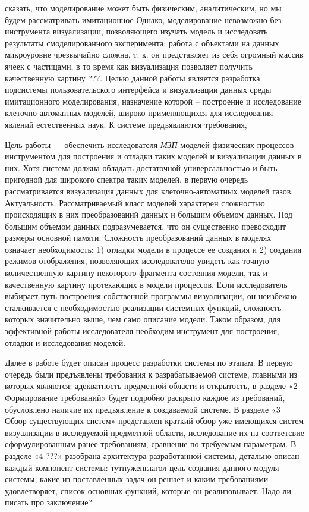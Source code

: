 \documentclass[a4paper,12pt]{extarticle}
\begin{document}
сказать, что моделирование может быть физическим, аналитическим, но мы будем рассматривать имитационное
Однако, моделирование невозможно без инструмента визуализации, позволяющего изучать модель и исследовать результаты смоделированного эксперимента: работа с объектами на данных микроуровне чрезвычайно сложна, т. к. он представляет из себя огромный массив ячеек с частицами, в то время как визуализация позволяет получить качественную картину ???. Целью данной работы является разработка подсистемы пользовательского интерфейса и визуализации данных среды имитационного моделирования, назначение которой – построение и исследование клеточно-автоматных моделей, широко применяющихся для исследования явлений естественных наук. К системе предъявляются требования, 

Цель работы — обеспечить исследователя \textit{МЗП} моделей физических процессов инструментом для построения и отладки таких моделей и визуализации данных в них. Хотя система должна обладать достаточной универсальностью и быть пригодной для широкого спектра таких моделей, в первую очередь рассматривается визуализация данных для клеточно-автоматных моделей газов. 
Актуальность. Рассматриваемый класс моделей характерен сложностью происходящих в них преобразований данных и большим объемом данных. Под большим объемом данных подразумевается, что он существенно превосходит размеры основной памяти. Сложность преобразований данных в моделях означает необходимость: 1) отладки модели в процессе ее создания и 2) создания режимов отображения, позволяющих исследователю увидеть как точную количественную картину некоторого фрагмента состояния модели, так и качественную картину протекающих в модели процессов. Если исследователь выбирает путь построения собственной программы визуализации, он неизбежно сталкивается с необходимостью реализации системных функций, сложность которых значительно выше, чем само описание модели.  Таком образом, для эффективной работы исследователя необходим инструмент для построения, отладки и исследования моделей.







Далее в работе будет описан процесс разработки системы по этапам. В первую очередь были предъявлены требования к разрабатываемой системе, главными из которых являются: адекватность предметной области и открытость, в разделе «2 Формирование требований» будет подробно раскрыто каждое из требований, обусловлено наличие их предъявление к создаваемой системе. В разделе «3 Обзор существующих систем» представлен краткий обзор уже имеющихся систем визуализации в исследуемой предметной области, исследование их на соответсвие сформулированным ранее требованиям, сравнение по требуемым параметрам. В разделе «4 ???» разобрана архитектура разработанной системы, детально описан каждый компонент системы: тутнуженглагол цель создания данного модуля системы, какие из поставленных задач он решает и каким требованиями удовлетворяет, список основных функций, которые он реализовывает. Надо ли писать про заключение?
\end{document}
